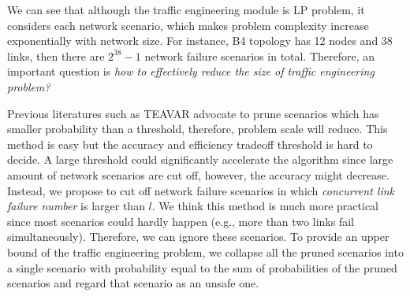 \documentclass[sigconf]{acmart}
\begin{document}
We can see that although the traffic engineering module is LP problem, it considers each network scenario, which makes problem complexity increase exponentially with network size.
For instance, B4 \cite{B4}  topology has 12 nodes and 38 links, then there are $2^{38}-1$ network failure scenarios in total.
Therefore,  an important question is  \textit{how to effectively reduce the size of  traffic engineering problem?} 


Previous literatures such as TEAVAR \cite{Teavar} advocate to prune scenarios which has smaller probability than a threshold, therefore, problem scale will reduce. 
This method is easy but the accuracy and efficiency tradeoff threshold is hard to decide.
A large threshold could significantly accelerate the algorithm since large amount of network scenarios are cut off, however, the accuracy might decrease.
Instead, we propose to cut off network failure scenarios in which \textit{concurrent link failure number} is larger than $l$.
We think this method is much more practical since most scenarios could hardly happen (e.g., more than two links fail simultaneously). 
Therefore, we can ignore these scenarios.
To provide an upper bound of the traffic engineering problem, we collapse all the pruned scenarios into a single scenario with probability equal to the sum of probabilities of the pruned scenarios and regard that scenario as an unsafe one.
\end{document}
